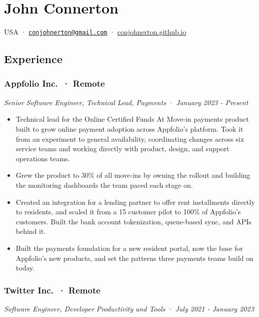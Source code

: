 \documentclass[
]{article}
\author{}
\date{}
\providecommand{\tightlist}{%
  \setlength{\itemsep}{0pt}\setlength{\parskip}{0pt}}
\begin{document}
\section{John Connerton}\label{john-connerton}

USA ·
\href{mailto:conjohnerton@gmail.com}{\nolinkurl{conjohnerton@gmail.com}}
· \href{https://conjohnerton.github.io}{conjohnerton.github.io}

\subsection{Experience}\label{experience}

\subsubsection{Appfolio Inc.~· Remote}\label{appfolio-inc.-remote}

\emph{Senior Software Engineer, Technical Lead, Payments} ·
\emph{January 2023 - Present}

\begin{itemize}
\tightlist
\item
  Technical lead for the Online Certified Funds At Move-in payments
  product built to grow online payment adoption across Appfolio's
  platform. Took it from an experiment to general availability,
  coordinating changes across six service teams and working directly
  with product, design, and support operations teams.
\item
  Grew the product to 30\% of all move-ins by owning the rollout and
  building the monitoring dashboards the team paced each stage on.
\item
  Created an integration for a lending partner to offer rent
  installments directly to residents, and scaled it from a 15 customer
  pilot to 100\% of Appfolio's customers. Built the bank account
  tokenization, queue-based sync, and APIs behind it.
\item
  Built the payments foundation for a new resident portal, now the base
  for Appfolio's new products, and set the patterns three payments teams
  build on today.
\end{itemize}

\subsubsection{Twitter Inc.~· Remote}\label{twitter-inc.-remote}

\emph{Software Engineer, Developer Productivity and Tools} · \emph{July
2021 - January 2023}
\end{document}
